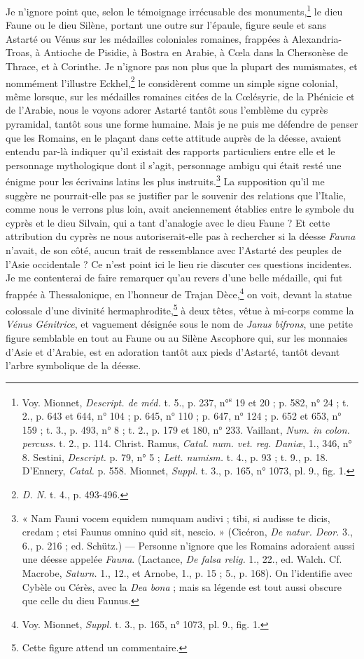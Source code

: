 \documentclass{article}
\begin{document}
Je n'ignore point que, selon le témoignage irrécusable des monuments,\footnote{Voy. Mionnet, \emph{Descript. de méd.} t. 5., p. 237, n°\textsuperscript{s} 19 et 20 ; p. 582, n° 24 ; t. 2., p. 643 et 644, n° 104 ; p. 645, n° 110 ; p. 647, n° 124 ; p. 652 et 653, n° 159 ; t. 3., p. 493, n° 8 ; t. 2., p. 179 et 180, n° 233. Vaillant, \emph{Num. in colon. percuss.} t. 2., p. 114. Christ. Ramus, \emph{Catal. num. vet. reg. Daniæ}, 1., 346, n° 8. Sestini, \emph{Descript.} p. 79, n° 5 ; \emph{Lett. numism.} t. 4., p. 93 ; t. 9., p. 18. D'Ennery, \emph{Catal.} p. 558. Mionnet, \emph{Suppl.} t. 3., p. 165, n° 1073, pl. 9., fig. 1.} le dieu Faune ou le dieu Silène, portant une outre sur l'épaule, figure seule et sans Astarté ou Vénus sur les médailles coloniales romaines, frappées à Alexandria-Troas, à Antioche de Pisidie, à Bostra en Arabie, à Cœla dans la Chersonèse de Thrace, et à Corinthe. Je n'ignore pas non plus que la plupart des numismates, et nommément l'illustre Eckhel,\footnote{\emph{D. N.} t. 4., p. 493-496.} le considèrent comme un simple signe colonial, même lorsque, sur les médailles romaines citées de la Cœlésyrie, de la Phénicie et de l'Arabie, nous le voyons adorer Astarté tantôt sous l'emblème du cyprès pyramidal, tantôt sous une forme humaine. Mais je ne puis me défendre de penser que les Romains, en le plaçant dans cette attitude auprès de la déesse, avaient entendu par-là indiquer qu'il existait des rapports particuliers entre elle et le personnage mythologique dont il s'agit, personnage ambigu qui était resté une énigme pour les écrivains latins les plus instruits.\footnote{« Nam Fauni vocem equidem numquam audivi ; tibi, si audisse te dicis, credam ; etsi Faunus omnino quid sit, nescio. » (Cicéron, \emph{De natur. Deor.} 3., 6., p. 216 ; ed. Schütz.) --- Personne n'ignore que les Romains adoraient aussi une déesse appelée \emph{Fauna}. (Lactance, \emph{De falsa relig.} 1., 22., ed. Walch. Cf. Macrobe, \emph{Saturn.} 1., 12., et Arnobe, 1., p. 15 ; 5., p. 168). On l'identifie avec Cybèle ou Cérès, avec la \emph{Dea bona} ; mais sa légende est tout aussi obscure que celle du dieu Faunus.} La supposition qu'il me suggère ne pourrait-elle pas se justifier par le souvenir des relations que l'Italie, comme nous le verrons plus loin, avait anciennement établies entre le symbole du cyprès et le dieu Silvain, qui a tant d'analogie avec le dieu Faune ? Et cette attribution du cyprès ne nous autoriserait-elle pas à rechercher si la déesse \emph{Fauna} n'avait, de son côté, aucun trait de ressemblance avec l'Astarté des peuples de l'Asie occidentale ? Ce n'est point ici le lieu rie discuter ces questions incidentes. Je me contenterai de faire remarquer qu'au revers d'une belle médaille, qui fut frappée à Thessalonique, en l'honneur de Trajan Dèce,\footnote{Voy. Mionnet, \emph{Suppl.} t. 3., p. 165, n° 1073, pl. 9., fig. 1.} on voit, devant la statue colossale d'une divinité hermaphrodite,\footnote{Cette figure attend un commentaire.} à deux têtes, vêtue à mi-corps comme la \emph{Vénus Génitrice}, et vaguement désignée sous le nom de \emph{Janus bifrons}, une petite figure semblable en tout au Faune ou au Silène Ascophore qui, sur les monnaies d'Asie et d'Arabie, est en adoration tantôt aux pieds d'Astarté, tantôt devant l'arbre symbolique de la déesse.
\end{document}
